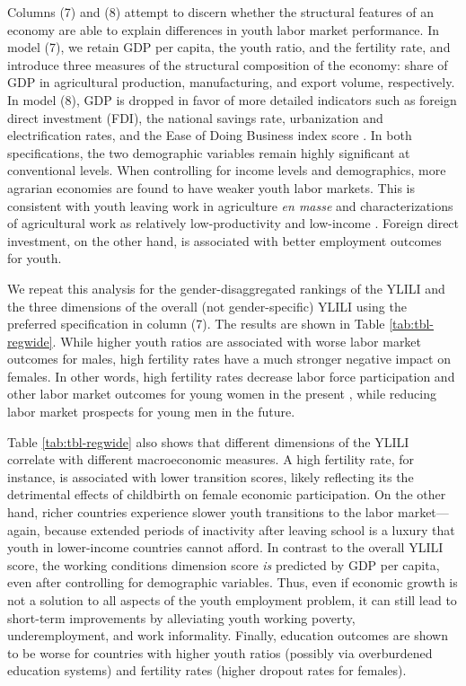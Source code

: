 \documentclass[
  a4paper, twoside, 12pt]{book}
\begin{document}
Columns (7) and (8) attempt to discern whether the structural features of an economy are able to explain differences in youth labor market performance. In model (7), we retain GDP per capita, the youth ratio, and the fertility rate, and introduce three measures of the structural composition of the economy: share of GDP in agricultural production, manufacturing, and export volume, respectively. In model (8), GDP is dropped in favor of more detailed indicators such as foreign direct investment (FDI), the national savings rate, urbanization and electrification rates, and the Ease of Doing Business index score \autocite[from the][]{worldbank2021a}. In both specifications, the two demographic variables remain highly significant at conventional levels. When controlling for income levels and demographics, more agrarian economies are found to have weaker youth labor markets. This is consistent with youth leaving work in agriculture \emph{en masse} and characterizations of agricultural work as relatively low-productivity and low-income \autocite{filmer2014}. Foreign direct investment, on the other hand, is associated with better employment outcomes for youth.

We repeat this analysis for the gender-disaggregated rankings of the YLILI and the three dimensions of the overall (not gender-specific) YLILI using the preferred specification in column (7). The results are shown in Table \ref{tab:tbl-regwide}. While higher youth ratios are associated with worse labor market outcomes for males, high fertility rates have a much stronger negative impact on females. In other words, high fertility rates decrease labor force participation and other labor market outcomes for young women in the present \autocite[in line with][]{bloom2009}, while reducing labor market prospects for young men in the future.

Table \ref{tab:tbl-regwide} also shows that different dimensions of the YLILI correlate with different macroeconomic measures. A high fertility rate, for instance, is associated with lower transition scores, likely reflecting its the detrimental effects of childbirth on female economic participation. On the other hand, richer countries experience slower youth transitions to the labor market---again, because extended periods of inactivity after leaving school is a luxury that youth in lower-income countries cannot afford. In contrast to the overall YLILI score, the working conditions dimension score \emph{is} predicted by GDP per capita, even after controlling for demographic variables. Thus, even if economic growth is not a solution to all aspects of the youth employment problem, it can still lead to short-term improvements by alleviating youth working poverty, underemployment, and work informality. Finally, education outcomes are shown to be worse for countries with higher youth ratios (possibly via overburdened education systems) and fertility rates (higher dropout rates for females).
\end{document}
